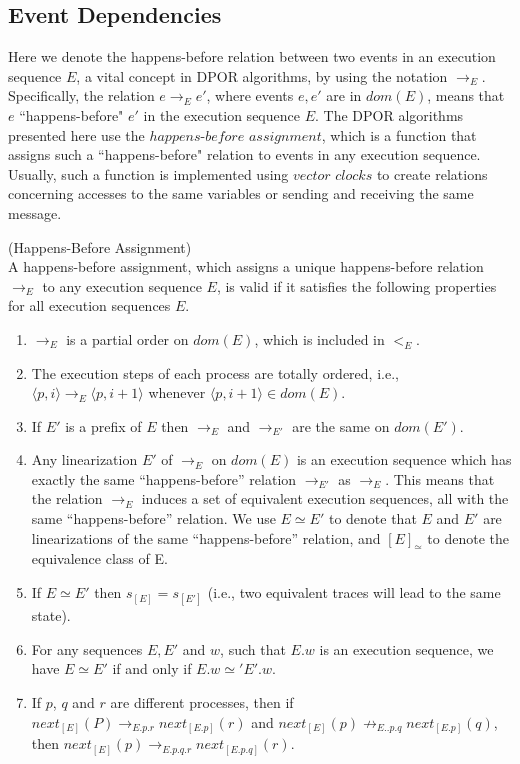 \subsection{Event Dependencies}

Here we denote the happens-before relation between two events in an execution sequence $E$,
a vital concept in DPOR algorithms, by using the notation $\rightarrow_E$. 
Specifically, the relation $e\rightarrow_Ee'$, where events $e,e'$ are in $dom(E)$,
means that $e$ ``happens-before" $e'$ in the execution sequence $E$.
The DPOR algorithms presented here use the $happens$-$before$ $assignment$, which is a function that 
assigns such a ``happens-before" relation to events in any execution sequence. 
Usually, such a function is implemented using $vector$ $clocks$ \cite{Mattern88virtualtime}
to create relations concerning accesses to the same variables or sending and receiving
the same message.

\begin{definition}{(Happens-Before Assignment)}\\
    A happens-before assignment, which assigns a
    unique happens-before relation $\rightarrow_E$ to any execution sequence
    $E$, is valid if it satisfies the following properties for all execution
    sequences $E$.
    \begin{enumerate}
        \item $\rightarrow_{E}$ is a partial order on $dom(E)$, which is included in $<_E$.
        \item The execution steps of each process are totally ordered, i.e., 
        $\langle p,i \rangle \rightarrow_E \langle p,i+1 \rangle$ whenever $\langle p, i+1 \rangle \in dom(E)$.
        \item If $E'$ is a prefix of $E$ then $\rightarrow_E$ and $\rightarrow_{E'}$ are the same on $dom(E')$.
        \item Any linearization $E'$ of $\rightarrow_E$ on $dom(E)$ is an execution sequence which has exactly the same “happens-before” relation
$\rightarrow_{E'}$ as $\rightarrow_E$. This means that the relation $\rightarrow_E$ induces a set
of equivalent execution sequences, all with the same “happens-before” relation. 
We use $E \simeq E'$ to denote that $E$ and $E'$ are
linearizations of the same “happens-before” relation, and $[E]_{\simeq}$ 
to denote the equivalence class of E.
    \item If $E \simeq E'$ then $s_{[E]} = s_{[E']}$ (i.e., two equivalent traces will lead to the same state).
    \item For any sequences $E, E'$ and $w$, such that $E.w$ is an execution
sequence, we have $E \simeq E'$  if and only if $E.w \simeq' E'.w$.
    \item If $p$, $q$ and $r$ are different processes, then
    if $next_{[E]}(P) \rightarrow_{E.p.r} next_{[E.p]}(r)$ and $next_{[E]}(p) \not\rightarrow_{E..p.q} next_{[E.p]}(q)$, then
    $next_{[E]}(p) \rightarrow_{E.p.q.r} next_{[E.p.q]}(r)$.
    \end{enumerate}
\end{definition}

